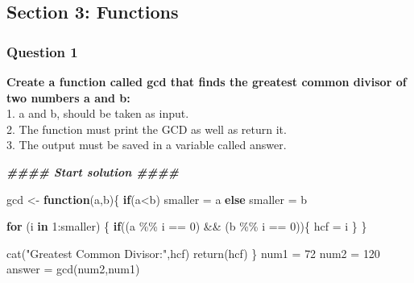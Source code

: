 \documentclass[
]{article}
\newenvironment{Shaded}{\begin{snugshade}}{\end{snugshade}}
\newcommand{\ControlFlowTok}[1]{\textcolor[rgb]{0.13,0.29,0.53}{\textbf{#1}}}
\newcommand{\DecValTok}[1]{\textcolor[rgb]{0.00,0.00,0.81}{#1}}
\newcommand{\DocumentationTok}[1]{\textcolor[rgb]{0.56,0.35,0.01}{\textbf{\textit{#1}}}}
\newcommand{\FunctionTok}[1]{\textcolor[rgb]{0.00,0.00,0.00}{#1}}
\newcommand{\NormalTok}[1]{#1}
\newcommand{\OtherTok}[1]{\textcolor[rgb]{0.56,0.35,0.01}{#1}}
\newcommand{\SpecialCharTok}[1]{\textcolor[rgb]{0.00,0.00,0.00}{#1}}
\newcommand{\StringTok}[1]{\textcolor[rgb]{0.31,0.60,0.02}{#1}}
\begin{document}
\hypertarget{section-3-functions}{%
\subsection{Section 3: Functions}\label{section-3-functions}}

\hypertarget{question-1-2}{%
\subsubsection{Question 1}\label{question-1-2}}

\textbf{Create a function called gcd that finds the greatest common
divisor of two numbers a and b:}\\
1. a and b, should be taken as input.\\
2. The function must print the GCD as well as return it.\\
3. The output must be saved in a variable called answer.

\begin{Shaded}
\begin{Highlighting}[]
\DocumentationTok{\#\#\#\# Start solution \#\#\#\#}
\end{Highlighting}
\end{Shaded}

\begin{Shaded}
\begin{Highlighting}[]
\NormalTok{gcd }\OtherTok{\textless{}{-}} \ControlFlowTok{function}\NormalTok{(a,b)\{}
     \ControlFlowTok{if}\NormalTok{(a}\SpecialCharTok{\textless{}}\NormalTok{b) smaller }\OtherTok{=}\NormalTok{ a    }
     \ControlFlowTok{else}\NormalTok{ smaller }\OtherTok{=}\NormalTok{ b}

     \ControlFlowTok{for}\NormalTok{ (i }\ControlFlowTok{in} \DecValTok{1}\SpecialCharTok{:}\NormalTok{smaller) \{}
          \ControlFlowTok{if}\NormalTok{((a }\SpecialCharTok{\%\%}\NormalTok{ i }\SpecialCharTok{==} \DecValTok{0}\NormalTok{) }\SpecialCharTok{\&\&}\NormalTok{ (b }\SpecialCharTok{\%\%}\NormalTok{ i }\SpecialCharTok{==} \DecValTok{0}\NormalTok{))\{}
\NormalTok{               hcf }\OtherTok{=}\NormalTok{ i}
\NormalTok{          \}}
\NormalTok{     \}}
     
     \FunctionTok{cat}\NormalTok{(}\StringTok{"Greatest Common Divisor:"}\NormalTok{,hcf)}
     \FunctionTok{return}\NormalTok{(hcf)}
\NormalTok{\}}
\NormalTok{num1 }\OtherTok{=} \DecValTok{72}
\NormalTok{num2 }\OtherTok{=} \DecValTok{120}
\NormalTok{answer }\OtherTok{=} \FunctionTok{gcd}\NormalTok{(num2,num1)}
\end{Highlighting}
\end{Shaded}
\end{document}
